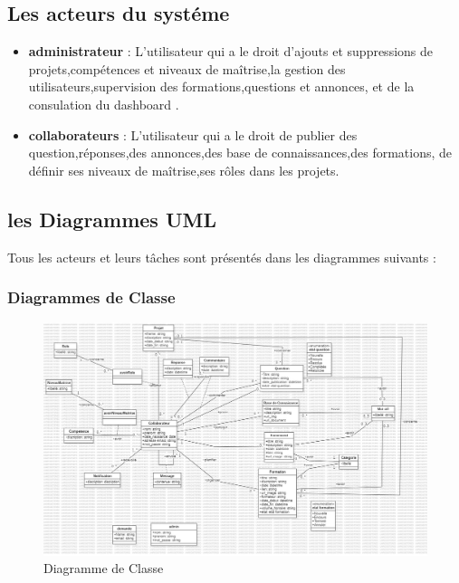 \documentclass{article}
\begin{document}
        \subsection{Les acteurs du systéme}  
            \begin{itemize}
                \item \textbf{administrateur} : L'utilisateur qui a le droit d'ajouts et suppressions de projets,compétences et niveaux de maîtrise,la gestion des utilisateurs,supervision des formations,questions et annonces, et de la consulation du dashboard .
                \item \textbf{collaborateurs} : L'utilisateur qui a le droit de publier des question,réponses,des annonces,des base de connaissances,des formations, de définir ses niveaux de maîtrise,ses rôles dans les projets.
            \end{itemize}

        \subsection{les Diagrammes UML}
            Tous les acteurs et leurs tâches sont présentés dans les diagrammes suivants :
            
            \subsubsection{Diagrammes de Classe}
                \begin{figure}[h!]
                    \centering
                    \includegraphics[width=1.0\textwidth]{assets/diagrammes/class.jpg}
                    \caption{Diagramme de Classe}
                \end{figure}
                \FloatBarrier   
\end{document}
